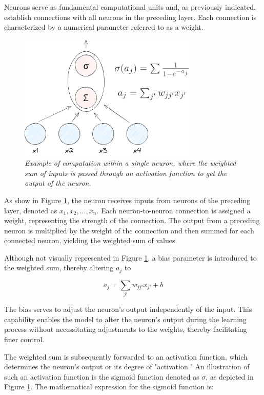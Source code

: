 Neurons serve as fundamental computational units and, as previously indicated, establish connections with all neurons in the preceding layer. Each connection is characterized by a numerical parameter referred to as a weight.


\begin{figure}[H]
    \centering
    \includegraphics[width=\textwidth,height=6cm,keepaspectratio=true]{1nn.png}
    \caption{
        \it{Example of computation within a single neuron, where the weighted sum
            of inputs is passed through an activation function to get the output of the neuron.}
    }
    \label{fig:1nn}
\end{figure}

As show in Figure \ref{fig:1nn}, the neuron receives inputs from neurons of the preceding layer, denoted as \(x_1, x_2, ..., x_n\). Each neuron-to-neuron connection is assigned a weight, representing the strength of the connection. The output from a preceding neuron is multiplied by the weight of the connection and then summed for each connected neuron, yielding the weighted sum of values.

Although not visually represented in Figure \ref{fig:1nn}, a bias parameter is introduced to the weighted sum, thereby altering \(a_j\) to

\begin{equation}
    a_j = \sum_{j'} w_{jj'}x_{j'} + b
\end{equation}

The bias serves to adjust the neuron's output independently of the input. This capability enables the model to alter the neuron's output during the learning process without necessitating adjustments to the weights, thereby facilitating finer control.

The weighted sum is subsequently forwarded to an activation function, which determines the neuron's output or its degree of "activation." An illustration of such an activation function is the sigmoid function denoted as \(\sigma\), as depicted in Figure \ref{fig:1nn}. The mathematical expression for the sigmoid function is:

